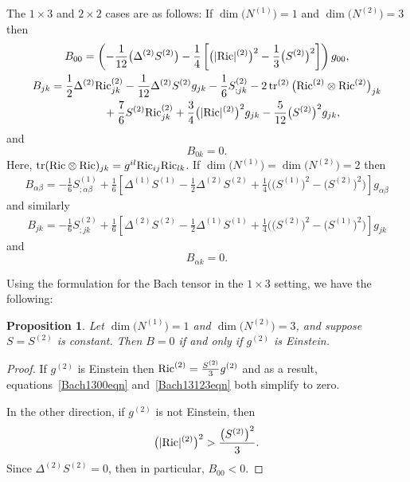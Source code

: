 \documentclass[10pt,a4paper]{amsart}
\numberwithin{equation}{section}
\newtheorem{Proposition}[Theorem]{Proposition}
 { \theoremstyle{definition}
\newtheorem{Definition}[Theorem]{Definition}
\newtheorem{Example}[Theorem]{Example}
\newtheorem{Remark}[Theorem]{Remark} }
\newcommand{\tr}{\operatorname{tr}} %
\begin{document}
The $1 \times 3$ and $2 \times 2$ cases are as follows: If $\dim\big(N^{(1)}\big) = 1$ and $\dim\big(N^{(2)}\big) = 3$ then
\begin{gather} \label{Bach1300eqn}
B_{00} = \left(-\frac{1}{12}\big(\Delta^{(2)} S^{(2)}\big)
		- \frac{1}{4}\left[ \big(|{\rm Ric}|^{(2)}\big)^2 - \frac{1}{3}\big(S^{(2)}\big)^2 \right] \right) g_{00},\\
B_{jk} = \frac{1}{2} \Delta^{(2)} {\rm Ric}^{(2)}_{jk}
				- \frac{1}{12} \Delta^{(2)} S^{(2)} g_{jk}
				- \frac{1}{6} S^{(2)}_{;jk}
			 - 2 \tr^{(2)}\big({\rm Ric}^{(2)} \otimes {\rm Ric}^{(2)}\big)_{jk}\nonumber\\
\hphantom{B_{jk} =}{}
				+ \frac{7}{6} S^{(2)} {\rm Ric}^{(2)}_{jk}
+ \frac{3}{4} \big(|{\rm Ric}|^{(2)}\big)^2 g_{jk}
				- \frac{5}{12} \big(S^{(2)}\big)^2 g_{jk},\label{Bach13123eqn}
\end{gather}
and
\[
B_{0 k} = 0.
\]
Here, $\tr({\rm Ric} \otimes {\rm Ric})_{jk} = g^{il} {\rm Ric}_{ij} {\rm Ric}_{lk}$. If $\dim\big(N^{(1)}\big) = \dim\big(N^{(2)}\big) = 2$ then
\begin{gather} \label{Bach22eqn1}
B_{\alpha \beta} = -\frac{1}{6} S^{(1)}_{;\alpha \beta}
		+ \frac{1}{6} \left[\Delta^{(1)} S^{(1)} - \frac{1}{2} \Delta^{(2)} S^{(2)}
						+ \frac{1}{4} \big(\big(S^{(1)}\big)^2 - \big(S^{(2)}\big)^2 \big) \right] g_{\alpha \beta}
\end{gather}
and similarly
\begin{gather} \label{Bach22eqn2}
B_{jk} = -\frac{1}{6} S^{(2)}_{;jk}
		+ \frac{1}{6} \left[\Delta^{(2)} S^{(2)} - \frac{1}{2} \Delta^{(1)} S^{(1)}
								+ \frac{1}{4} \big(\big(S^{(2)}\big)^2 - \big(S^{(1)}\big)^2 \big) \right] g_{jk}
\end{gather}
and
\[
B_{\alpha k} = 0.
\]

Using the formulation for the Bach tensor in the $1 \times 3$ setting, we have the following:

\begin{Proposition} \label{EinsteinSliceprop}
Let $\dim\big(N^{(1)}\big) = 1$ and $\dim\big(N^{(2)}\big) = 3$, and suppose $S = S^{(2)}$ is constant. Then $B = 0$ if and only if $g^{(2)}$ is Einstein.
\end{Proposition}

\begin{proof}If $g^{(2)}$ is Einstein then ${\rm Ric}^{(2)} = \frac{S^{(2)}}{3} g^{(2)}$ and as a result, equations~\eqref{Bach1300eqn} and~\eqref{Bach13123eqn} both simplify to zero.

In the other direction, if $g^{(2)}$ is not Einstein, then
\[
\big(|{\rm Ric}|^{(2)}\big)^2 > \frac{\big(S^{(2)}\big)^2}{3}.
\]
Since $\Delta^{(2)} S^{(2)} = 0$, then in particular, $B_{00} < 0$.
\end{proof}
\end{document}

